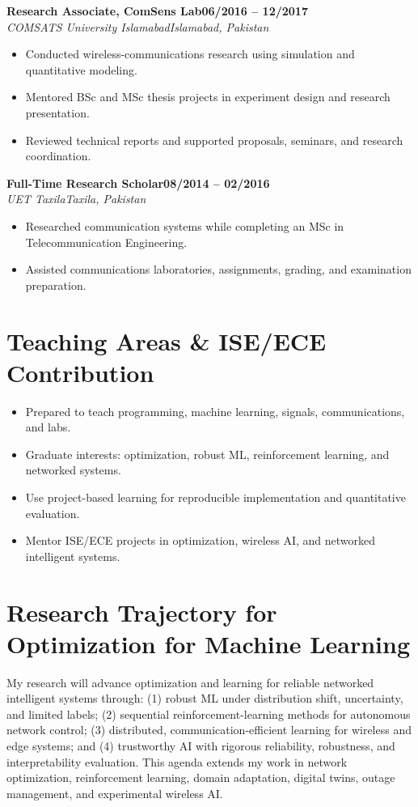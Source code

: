 \documentclass[9pt,letterpaper]{extarticle}
\newcommand{\role}[4]{\Needspace{4\baselineskip}\textbf{#1}\hfill\textbf{#2}\\[-1pt]\textit{#3}\hfill\textit{#4}\par}
\begin{document}
\role{Research Associate, ComSens Lab}{06/2016 -- 12/2017}{COMSATS University Islamabad}{Islamabad, Pakistan}
\begin{itemize}
\item Conducted wireless-communications research using simulation and quantitative modeling.
\item Mentored BSc and MSc thesis projects in experiment design and research presentation.
\item Reviewed technical reports and supported proposals, seminars, and research coordination.
\end{itemize}

\role{Full-Time Research Scholar}{08/2014 -- 02/2016}{UET Taxila}{Taxila, Pakistan}
\begin{itemize}
\item Researched communication systems while completing an MSc in Telecommunication Engineering.
\item Assisted communications laboratories, assignments, grading, and examination preparation.
\end{itemize}

\section{Teaching Areas \& ISE/ECE Contribution}
\begin{itemize}
\item Prepared to teach programming, machine learning, signals, communications, and labs.
\item Graduate interests: optimization, robust ML, reinforcement learning, and networked systems.
\item Use project-based learning for reproducible implementation and quantitative evaluation.
\item Mentor ISE/ECE projects in optimization, wireless AI, and networked intelligent systems.
\end{itemize}

\section{Research Trajectory for Optimization for Machine Learning}
My research will advance optimization and learning for reliable networked intelligent systems through: (1) robust ML under distribution shift, uncertainty, and limited labels; (2) sequential reinforcement-learning methods for autonomous network control; (3) distributed, communication-efficient learning for wireless and edge systems; and (4) trustworthy AI with rigorous reliability, robustness, and interpretability evaluation. This agenda extends my work in network optimization, reinforcement learning, domain adaptation, digital twins, outage management, and experimental wireless AI.
\end{document}
